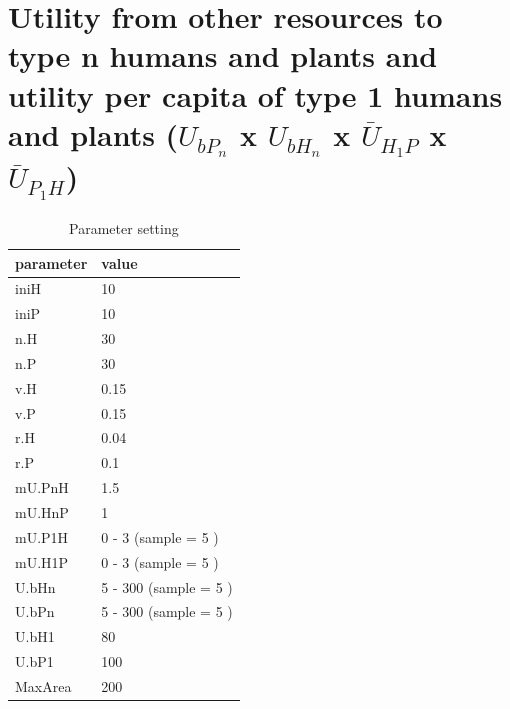 \documentclass[
]{book}
\begin{document}
\newpage

\hypertarget{utility-from-other-resources-to-type-n-humans-and-plants-and-utility-per-capita-of-type-1-humans-and-plants-u_bp_n-x-u_bh_n-x-baru_h_1p-x-baru_p_1h}{%
\section{\texorpdfstring{Utility from other resources to type n humans and plants and utility per capita of type 1 humans and plants (\(U_{bP_{n}}\) x \(U_{bH_{n}}\) x \(\bar{U}_{H_{1}P}\) x \(\bar{U}_{P_{1}H}\))}{Utility from other resources to type n humans and plants and utility per capita of type 1 humans and plants (U\_\{bP\_\{n\}\} x U\_\{bH\_\{n\}\} x \textbackslash bar\{U\}\_\{H\_\{1\}P\} x \textbackslash bar\{U\}\_\{P\_\{1\}H\})}}\label{utility-from-other-resources-to-type-n-humans-and-plants-and-utility-per-capita-of-type-1-humans-and-plants-u_bp_n-x-u_bh_n-x-baru_h_1p-x-baru_p_1h}}


\begin{table}[!h]

\caption{\label{tab:4UbnmU1tablepdf}Parameter setting}
\centering
\begin{tabular}[t]{l|l}
\hline
parameter & value\\
\hline
iniH & 10\\
\hline
iniP & 10\\
\hline
n.H & 30\\
\hline
n.P & 30\\
\hline
v.H & 0.15\\
\hline
v.P & 0.15\\
\hline
r.H & 0.04\\
\hline
r.P & 0.1\\
\hline
mU.PnH & 1.5\\
\hline
mU.HnP & 1\\
\hline
mU.P1H & 0 - 3 (sample = 5 )\\
\hline
mU.H1P & 0 - 3 (sample = 5 )\\
\hline
U.bHn & 5 - 300 (sample = 5 )\\
\hline
U.bPn & 5 - 300 (sample = 5 )\\
\hline
U.bH1 & 80\\
\hline
U.bP1 & 100\\
\hline
MaxArea & 200\\
\hline
\end{tabular}
\end{table}
\end{document}
